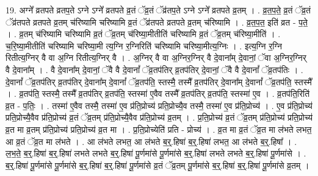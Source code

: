 \documentclass[17pt]{extarticle}
\begin{document}
19. अग्ने᳚ व्रतपते व्रतप॒ते ऽग्ने ऽग्ने᳚ व्रतपते व्र॒तं ॅव्र॒तं ॅव्र॑तप॒ते ऽग्ने ऽग्ने᳚ व्रतपते व्र॒तम् । . व्र॒त॒प॒ते॒ व्र॒तं ॅव्र॒तं ॅव्र॑तपते व्रतपते व्र॒तम् च॑रिष्यामि चरिष्यामि व्र॒तं ॅव्र॑तपते व्रतपते व्र॒तम् च॑रिष्यामि । . व्र॒त॒प॒त॒ इति॑ व्रत - प॒ते॒ । . व्र॒तम् च॑रिष्यामि चरिष्यामि व्र॒तं ॅव्र॒तम् च॑रिष्या॒मीतीति॑ चरिष्यामि व्र॒तं ॅव्र॒तम् च॑रिष्या॒मीति॑ । . च॒रि॒ष्या॒मीतीति॑ चरिष्यामि चरिष्या॒मी त्य॒ग्नि र॒ग्निरिति॑ चरिष्यामि चरिष्या॒मीत्य॒ग्निः । . इत्य॒ग्नि र॒ग्नि रितीत्य॒ग्निर् वै वा अ॒ग्नि रितीत्य॒ग्निर् वै । . अ॒ग्निर् वै वा अ॒ग्निर॒ग्निर् वै दे॒वाना᳚म् दे॒वानां॒ ॅवा अ॒ग्निर॒ग्निर् वै दे॒वाना᳚म् । . वै दे॒वाना᳚म् दे॒वानां॒ ॅवै वै दे॒वानां᳚ ॅव्र॒तप॑तिर् व्र॒तप॑तिर् दे॒वानां॒ ॅवै वै दे॒वानां᳚ ॅव्र॒तप॑तिः । . दे॒वानां᳚ ॅव्र॒तप॑तिर् व्र॒तप॑तिर् दे॒वाना᳚म् दे॒वानां᳚ ॅव्र॒तप॑ति॒ स्तस्मै॒ तस्मै᳚ व्र॒तप॑तिर् दे॒वाना᳚म् दे॒वानां᳚ ॅव्र॒तप॑ति॒ स्तस्मै᳚ । . व्र॒तप॑ति॒ स्तस्मै॒ तस्मै᳚ व्र॒तप॑तिर् व्र॒तप॑ति॒ स्तस्मा॑ ए॒वैव तस्मै᳚ व्र॒तप॑तिर् व्र॒तप॑ति॒ स्तस्मा॑ ए॒व । . व्र॒तप॑ति॒रिति॑ व्र॒त - प॒तिः॒ । . तस्मा॑ ए॒वैव तस्मै॒ तस्मा॑ ए॒व प्र॑ति॒प्रोच्य॑ प्रति॒प्रोच्यै॒व तस्मै॒ तस्मा॑ ए॒व प्र॑ति॒प्रोच्य॑ । . ए॒व प्र॑ति॒प्रोच्य॑ प्रति॒प्रोच्यै॒वैव प्र॑ति॒प्रोच्य॑ व्र॒तं ॅव्र॒तम् प्र॑ति॒प्रोच्यै॒वैव प्र॑ति॒प्रोच्य॑ व्र॒तम् । . प्र॒ति॒प्रोच्य॑ व्र॒तं ॅव्र॒तम् प्र॑ति॒प्रोच्य॑ प्रति॒प्रोच्य॑ व्र॒त मा व्र॒तम् प्र॑ति॒प्रोच्य॑ प्रति॒प्रोच्य॑ व्र॒त मा । . प्र॒ति॒प्रोच्येति॑ प्रति - प्रोच्य॑ । . व्र॒त मा व्र॒तं ॅव्र॒त मा ल॑भते लभत॒ आ व्र॒तं ॅव्र॒त मा ल॑भते । . आ ल॑भते लभत॒ आ ल॑भते ब॒र्॒.हिषा॑ ब॒र्॒.हिषा॑ लभत॒ आ ल॑भते ब॒र्॒.हिषा᳚ । . ल॒भ॒ते॒ ब॒र्॒.हिषा॑ ब॒र्॒.हिषा॑ लभते लभते ब॒र्॒.हिषा॑ पू॒र्णमा॑से पू॒र्णमा॑से ब॒र्॒.हिषा॑ लभते लभते ब॒र्॒.हिषा॑ पू॒र्णमा॑से । . ब॒र्॒.हिषा॑ पू॒र्णमा॑से पू॒र्णमा॑से ब॒र्॒.हिषा॑ ब॒र्॒.हिषा॑ पू॒र्णमा॑से व्र॒तं ॅव्र॒तम् पू॒र्णमा॑से ब॒र्॒.हिषा॑ ब॒र्॒.हिषा॑ पू॒र्णमा॑से व्र॒तम् । \newline
\end{document}

